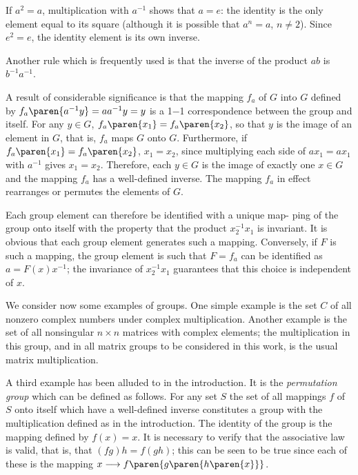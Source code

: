 If $a^{2} = a$, multiplication with $a^{-1}$ shows that $a = e$: the identity is the only element equal to its square (although it is possible that $a^{n} = a$, $n \ne 2$). Since $e^{2} = e$, the identity element is its own inverse.

Another rule which is frequently used is that the inverse of the product $ab$ is $b^{-1} a^{-1}$.

A result of considerable significance is that the mapping $f_{a}$ of $G$ into $G$ defined by $f_{a}\paren{a^{-1}y}  = aa^{-1}y = y$ is a 1$-$1 correspondence between the group and itself. For any $y \in G$, $f_{a}\paren{x_{1}} = f_{a}\paren{x_{2}}$, so that $y$ is the image of an element in $G$, that is, $f_{a}$ maps $G$ onto $G$. Furthermore, if $f_{a}\paren{x_{1}} = f_{a}\paren{x_{2}}$, $x_{1} = x_{2}$, since multiplying each side of $ax_{1} = ax_{1}$ with $a^{-1}$ gives $x_{1} = x_{2}$. Therefore, each $y \in G$ is the image of exactly one $x \in G$ and the mapping $f_{a}$ has a well-defined inverse. The mapping $f_{a}$ in effect rearranges or permutes the elements of $G$.

Each group element can therefore be identified with a unique map- ping of the group onto itself with the property that the product $x_{2}^{-1} x_{1}$ is invariant. It is obvious that each group element generates such a mapping. Conversely, if $F$ is such a mapping, the group element is such that $F = f_{a}$ can be identified as $a = F(x)x^{-1}$; the invariance of $x_{2}^{-1} x_{1}$ guarantees that this choice is independent of $x$.

We consider now some examples of groups. One simple example is the set $C$ of all nonzero complex numbers under complex multiplication. Another example is the set of all nonsingular $n \times n$ matrices with complex elements; the multiplication in this group, and in all matrix groups to be considered in this work, is the usual matrix multiplication.

A third example has been alluded to in the introduction. It is the \emph{permutation group} which can be defined as follows. 	For any set $S$ the set of all mappings $f$ of $S$ onto itself which have a well-defined inverse constitutes a group with the multiplication defined as in the introduction. The identity of the group is the mapping defined by $f(x) = x$. It is necessary to verify that the associative law is valid, that is, that $(fg)h = f(gh)$; this can be seen to be true since each of these is the mapping $x \longrightarrow f\paren{g\paren{h\paren{x} } } $.

